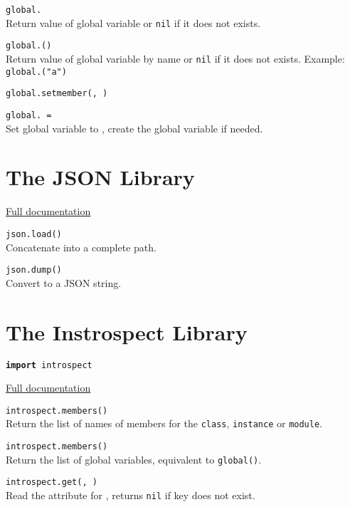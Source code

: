 \hangpar \texttt{global.} \\	
Return value of global variable  or \texttt{nil} if it does not exists.

\hangpar \texttt{global.(}\texttt{)} \\
Return value of global variable  by name or \texttt{nil} if it does not exists. Example: \texttt{global.("a")}

\hangpar \texttt{global.setmember(}\texttt{, }\texttt{)}

\hangpar \texttt{global.}\texttt{ = } \\
Set global variable  to , create the global variable if needed.

\section*{The JSON Library}

\hangpar \href{https://github.com/berry-lang/berry/wiki/Chapter-7\#json-module}{Full documentation}

\hangpar \texttt{json.load(}\texttt{)} \\
Concatenate  into a complete path.

\hangpar \texttt{json.dump(}\texttt{)} \\
Convert  to a JSON string.

\section*{The Instrospect Library}

\hangpar \texttt{\textbf{import} introspect}

\hangpar \href{https://github.com/berry-lang/berry/wiki/Chapter-7\#module-introspect}{Full documentation}

\hangpar \texttt{introspect.members(}\texttt{)} \\
Return the list of names of members for the \texttt{class}, \texttt{instance} or \texttt{module}.

\hangpar \texttt{introspect.members()} \\
Return the list of global variables, equivalent to \texttt{global()}.

\hangpar \texttt{introspect.get(}\texttt{, }\texttt{)} \\
Read the attribute  for , returns \texttt{nil} if key does not exist.

